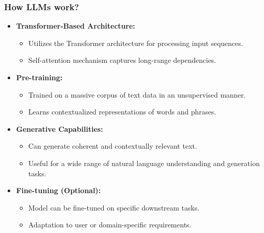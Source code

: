 \begin{frame}[fragile]\frametitle{How LLMs work?}

  \begin{itemize}
    \item \textbf{Transformer-Based Architecture:}
      \begin{itemize}
        \item Utilizes the Transformer architecture for processing input sequences.
        \item Self-attention mechanism captures long-range dependencies.
      \end{itemize}

    \item \textbf{Pre-training:} 
      \begin{itemize}
        \item Trained on a massive corpus of text data in an unsupervised manner.
        \item Learns contextualized representations of words and phrases.
      \end{itemize}
	  

    \item \textbf{Generative Capabilities:}
      \begin{itemize}
        \item Can generate coherent and contextually relevant text.
        \item Useful for a wide range of natural language understanding and generation tasks.
      \end{itemize}
	  
    \item \textbf{Fine-tuning (Optional):}
      \begin{itemize}
        \item Model can be fine-tuned on specific downstream tasks.
        \item Adaptation to user or domain-specific requirements.
      \end{itemize}

  \end{itemize}

\end{frame}

